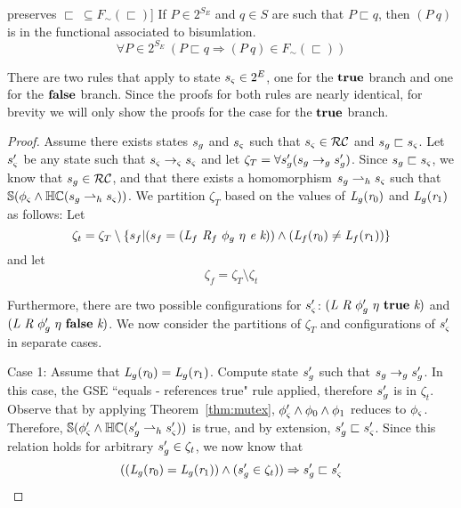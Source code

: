 \begin{lemma} preserves $\sqsubset\ \subseteq F_\sim(\sqsubset)$]
If $P \in 2^{S_\mathit{E}}$ and $q \in S$ are such that $P \sqsubset q$, then $(P\ q)$ is in the functional associated to bisumlation.
\label{lem:access}
$$
\forall P \in 2^{S_\mathit{E}}\ (P \sqsubset q \Rightarrow (P\ q) \in F_\sim(\sqsubset))
$$
\end{lemma}

There are two rules that apply to state $s_{\varsigma} \in 2^{E}$, one for the $\textbf{true}$ branch and one for the $\textbf{false}$ branch. Since the proofs for both rules are nearly identical, for brevity we will only show the proofs for the case for the $\textbf{true}$ branch. 
\begin{proof}
Assume there exists states $s_{g}$ and $s_{\varsigma}$ such that $s_{\varsigma} \in \mathcal{RC}$ and $s_{g} \sqsubset s_{\varsigma}$. Let $s_{\varsigma}^\prime$ be any state such that $s_{\varsigma} \rightarrow_{\varsigma} s_{\varsigma}$ and let $\zeta_T = \forall s_{g}^\prime ( s_{g} \rightarrow_{g} s_{g}^\prime )$. Since $s_{g} \sqsubset s_{\varsigma}$, we know that $s_{g} \in \mathcal{RC}$, and that there exists a homomorphism $s_{g} \rightharpoonup_{h} s_{\varsigma}$ such that $\mathbb{S}( \phi_{\varsigma} \wedge \mathbb{HC}(s_{g} \rightharpoonup_{h} s_{\varsigma}) ) $. We partition $\zeta_T$ based on the values of $\emph{L}_{g} ( \emph{r}_0)$ and $\emph{L}_{g} ( \emph{r}_1 )$ as follows: Let
$$\zeta_t = \zeta_T \setminus \{ s_f | (s_f= ( \emph{L}_f\ \emph{R}_f\ \phi_{g}\ \eta\ \emph{e}\ \emph{k})) \wedge (\emph{L}_f ( \emph{r}_0) \neq \emph{L}_f ( \emph{r}_1 ) ) \}$$
and let
$$\zeta_f = \zeta_T \setminus \zeta_t$$ 

Furthermore, there are two possible configurations for $s_{\varsigma}^\prime$: $\lp \cfgnt{L}\ \cfgnt{R}\ \phi_g^\prime\ \eta\ \cfgt{true}\ \cfgnt{k}\rp $ and $\lp \cfgnt{L}\ \cfgnt{R}\ \phi_g^\prime\ \eta\ \cfgt{false}\ \cfgnt{k}\rp $. We now consider the partitions of $\zeta_T$ and configurations of $s_{\varsigma}^\prime$ in separate cases.

Case 1: Assume that $\emph{L}_{g} ( \emph{r}_0) = \emph{L}_{g} ( \emph{r}_1 )$. 
Compute state $s_{g}^\prime$ such that $s_{g} \rightarrow_{g} s_{g}^\prime$. In this case, the GSE ``equals - references true" rule applied, therefore $s_{g}^\prime$ is in $\zeta_t$. Observe that by applying Theorem~\ref{thm:mutex}, $\phi_{\varsigma}^\prime \wedge \phi_0 \wedge \phi_1$ reduces to $\phi_{\varsigma}$. Therefore, $\mathbb{S}( \phi_{\varsigma}^\prime \wedge \mathbb{HC}(s_{g}^\prime \rightharpoonup_{h} s_{\varsigma}^\prime) ) $ is true, and by extension, $s_{g}^\prime \sqsubset s_{\varsigma}^\prime$. Since this relation holds for arbitrary $s_{g}^\prime \in \zeta_t$, we now know that 
\begin{equation}
\label{eqn:RCForwardsTrue}
((\emph{L}_{g} ( \emph{r}_0) = \emph{L}_{g} ( \emph{r}_1 )) \wedge (s_{g}^\prime \in \zeta_t)) \Rightarrow s_{g}^\prime \sqsubset s_{\varsigma}^\prime
\end{equation}


\end{proof}
